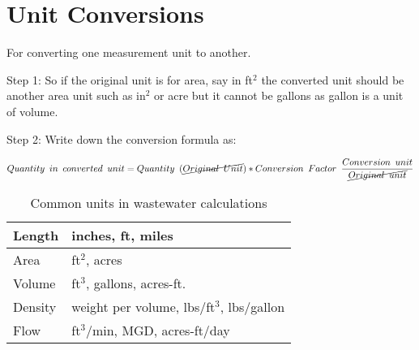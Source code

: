 \section{Unit Conversions}
For converting one measurement unit to another.

Step 1:    So if the original unit is for area, say in ft$^2$ the converted unit should be another area unit such as in$^2$ or acre but it cannot be gallons as gallon is a unit of volume.

Step 2: Write down the conversion formula as:

$Quantity \enspace in \enspace converted \enspace unit = Quantity \enspace (\cancel{Original \enspace Unit}) *   Conversion  \enspace Factor \enspace  \dfrac{Conversion \enspace unit}{\cancel{Original \enspace unit}}$


\begin{table}[h!]

\begin{center}
    \begin{tabular}{ | p{4cm} |p{8cm}|}
    \hline
    
    
Length  & inches, ft, miles\\
\hline 
Area  & ft$^2$, acres \\
\hline 
Volume & ft$^3$, gallons, acres-ft.\\
\hline 
Density & weight per volume, lbs/ft$^3$, lbs/gallon\\
\hline 
Flow & ft$^3$/min, MGD, acres-ft/day\\
\hline 

	

    \end{tabular}
 \caption{Common units in wastewater calculations}	
    \end{center}

    \end{table}



